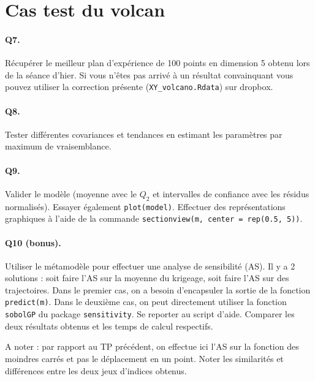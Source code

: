 \documentclass[12pt]{scrartcl}
\begin{document}
\section{Cas test du volcan}

\paragraph{Q7.} Récupérer le meilleur plan d'expérience de 100 points en dimension 5 obtenu lors de la séance d'hier. 
Si vous n'êtes pas arrivé à un résultat convainquant vous pouvez utiliser la correction présente (\texttt{XY\_volcano.Rdata}) sur dropbox.

\paragraph{Q8.} Tester différentes covariances et tendances en estimant les paramètres par maximum de vraisemblance.

\paragraph{Q9. } Valider le modèle (moyenne avec le $Q_2$ et intervalles de confiance avec les résidus normalisés). Essayer également \texttt{plot(model)}. Effectuer des représentations graphiques à l'aide de la commande \texttt{sectionview(m, center = rep(0.5, 5))}. 

\paragraph{Q10 (bonus).} Utiliser le métamodèle pour effectuer une analyse de sensibilité (AS). Il y a 2 solutions : soit faire l'AS sur la moyenne du krigeage, soit faire l'AS sur des trajectoires.
Dans le premier cas, on a besoin d'encapsuler la sortie de la fonction \texttt{predict(m)}. Dans le deuxième cas, on peut directement utiliser la fonction \texttt{sobolGP} du package \texttt{sensitivity}.
Se reporter au script d'aide. Comparer les deux résultats obtenus et les temps de calcul respectifs.

A noter : par rapport au TP précédent, on effectue ici l'AS sur la fonction des moindres carrés et pas le déplacement en un point. Noter les similarités et différences entre les deux jeux d'indices obtenus.
\end{document}
